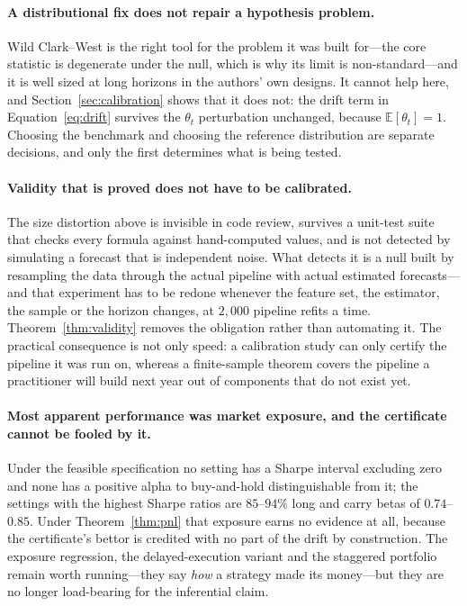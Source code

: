\documentclass{article}
\theoremstyle{plain}
\theoremstyle{definition}
\begin{document}
\paragraph{A distributional fix does not repair a hypothesis problem.}
Wild Clark--West \citep{pincheira2021} is the right tool for the problem it was built
for---the core statistic is degenerate under the null, which is why its limit is
non-standard---and it is well sized at long horizons in the authors' own designs. It cannot
help here, and Section~\ref{sec:calibration} shows that it does not: the drift term in
Equation~\eqref{eq:drift} survives the $\theta_t$ perturbation unchanged, because
$\mathbb{E}[\theta_t]=1$. Choosing the benchmark and choosing the reference distribution are
separate decisions, and only the first determines what is being tested.

\paragraph{Validity that is proved does not have to be calibrated.}
The size distortion above is invisible in code review, survives a unit-test suite that
checks every formula against hand-computed values, and is not detected by simulating a
forecast that is independent noise. What detects it is a null built by resampling the data
through the actual pipeline with actual estimated forecasts---and that experiment has to be
redone whenever the feature set, the estimator, the sample or the horizon changes, at
$2{,}000$ pipeline refits a time. Theorem~\ref{thm:validity} removes the obligation rather
than automating it. The practical consequence is not only speed: a calibration study can
only certify the pipeline it was run on, whereas a finite-sample theorem covers the pipeline
a practitioner will build next year out of components that do not exist yet.

\paragraph{Most apparent performance was market exposure, and the certificate cannot be
fooled by it.} Under the feasible specification no setting has a Sharpe interval excluding
zero and none has a positive alpha to buy-and-hold distinguishable from it; the settings with
the highest Sharpe ratios are $85$--$94\%$ long and carry betas of $0.74$--$0.85$. Under Theorem~\ref{thm:pnl} that exposure earns no
evidence at all, because the certificate's bettor is credited with no part of the drift by
construction. The exposure regression, the delayed-execution variant and the staggered
portfolio remain worth running---they say \emph{how} a strategy made its money---but they are
no longer load-bearing for the inferential claim.
\end{document}
